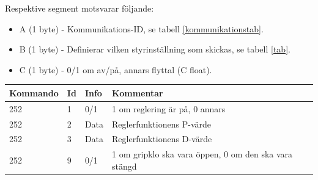 \documentclass[11pt]{article}
\begin{document}
\begin{flushleft}
Respektive segment motsvarar följande: 
\begin{itemize}
	\item A (1 byte) - Kommunikations-ID, se tabell \ref{kommunikationstab}.
	\item B (1 byte) - Definierar vilken styrinställning som skickas, se tabell \ref{tab}.
	\item C (1 byte) - 0/1 om av/på, annars flyttal (C float).
\end{itemize}




\pagebreak

\begin{table}[H]
\begin{tabular}{|p{6em}|p{1em}|p{6em}|p{22em}|} \hline

\textbf{Kommando} & \textbf{Id} & \textbf{Info} & \textbf{Kommentar}\\ \hline

252 & 1 & 0/1 & 1 om reglering är på, 0 annars \\ \hline
252 & 2 & Data & Reglerfunktionens P-värde \\ \hline
252 & 3 & Data & Reglerfunktionens D-värde \\ \hline
252 & 9 & 0/1 & 1 om gripklo ska vara öppen, 0 om den ska vara stängd \\ \hline


\end{tabular}
\end{table}
\end{flushleft}
\end{document}
